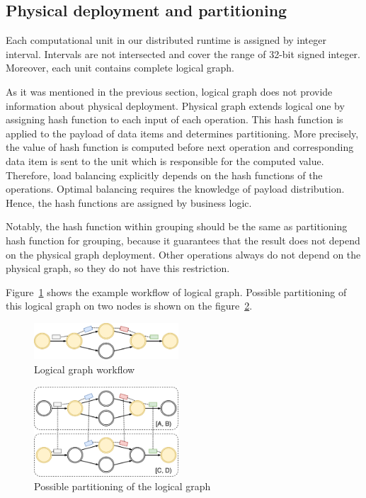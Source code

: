 \subsection{Physical deployment and partitioning}

Each computational unit in our distributed runtime is assigned by integer interval. Intervals are not intersected and cover the range of 32-bit signed integer. Moreover, each unit contains complete logical graph.

As it was mentioned in the previous section, logical graph does not provide information about physical deployment. Physical graph extends logical one by assigning hash function to each input of each operation. This hash function is applied to the payload of data items and determines partitioning. More precisely, the value of hash function is computed before next operation and corresponding data item is sent to the unit which is responsible for the computed value. Therefore, load balancing explicitly depends on the hash functions of the operations. Optimal balancing requires the knowledge of payload distribution. Hence, the hash functions are assigned by business logic.

Notably, the hash function within grouping should be the same as partitioning hash function for grouping, because it guarantees that the result does not depend on the physical graph deployment. Other operations always do not depend on the physical graph, so they do not have this restriction.

Figure~\ref{logical-graph-figure} shows the example workflow of logical graph. Possible partitioning of this logical graph on two nodes is shown on the figure~\ref{physical-graph-figure}.

\begin{figure}[htbp]
  \centering
  \includegraphics[width=0.48\textwidth]{pics/logical-graph}
  \caption{Logical graph workflow}
  \label {logical-graph-figure}
\end{figure}

\begin{figure}[htbp]
  \centering
  \includegraphics[width=0.48\textwidth]{pics/physical-graph}
  \caption{Possible partitioning of the logical graph}
  \label {physical-graph-figure}
\end{figure}

